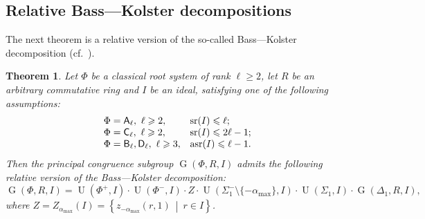\documentclass[oneside, 12pt]{amsart}
\theoremstyle{plain}
\newtheorem{thm}{Theorem}
\numberwithin{equation}{section}
\numberwithin{lemma}{section}
\theoremstyle{definition}
\theoremstyle{remark}
\DeclareMathOperator{\G}{G}
\DeclareMathOperator{\U}{U}
\DeclareMathOperator{\sr}{sr}
\DeclareMathOperator{\asr}{asr}
\newcommand{\rA}{\mathsf{A}}
\newcommand{\rB}{\mathsf{B}}
\newcommand{\rC}{\mathsf{C}}
\newcommand{\rD}{\mathsf{D}}
\begin{document}
\subsection{Relative Bass---Kolster decompositions}\label{sec:bass-kolster}
The next theorem is a relative version of the so-called Bass---Kolster decomposition (cf.~\cite[Theorem~2.1]{St78}).
\begin{thm}\label{thm:BassKolster}
Let $\Phi$ be a classical root system of rank $\ell\geqslant2$, let $R$ be an arbitrary commutative ring and $I$ be an ideal, satisfying one of the following assumptions:
\[\begin{array}{l@{\quad}l@{\quad}l@{\quad}c}
\Phi = \rA_\ell, \ \ell\geqslant 2, & \sr(I) \leqslant \ell; \\
\Phi = \rC_\ell, \ \ell\geqslant 2, & \sr(I) \leqslant 2\ell-1; \\
\Phi = \rB_\ell, \rD_\ell, \ \ell\geqslant 3, & \asr(I) \leqslant \ell-1.
\end{array}\]
Then the principal congruence subgroup $\G(\Phi, R, I)$ admits the following relative version of the Bass---Kolster decomposition:
\[ \G(\Phi, R, I)=  \U(\Phi^+, I) \cdot \U(\Phi^-, I) \cdot Z \cdot \U(\Sigma_1^-\setminus\{-\alpha_\mathrm{max}\}, I) \cdot \U(\Sigma_1, I) \cdot \G(\Delta_1, R, I), \]
where $Z = Z_{\alpha_\mathrm{max}}(I)=\left\{z_{-\alpha_\mathrm{max}}(r, 1)\ \middle|\ r\in I \right\}$.
\end{thm}
\end{document}
